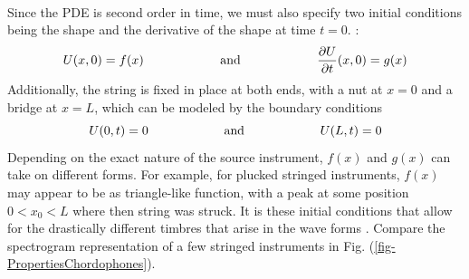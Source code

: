 \documentclass[12pt,letterpaper]{article}
\begin{document}
\paragraph*{}Since the PDE is second order in time, we must also specify two initial conditions being the shape and the derivative of the shape at time $t = 0$.  \cite{Olson,White,Haberman}:
\begin{equation}
U(x,0) = f(x) 
	\text{\hspace*{2cm} and \hspace*{2cm}}
\frac{\partial U}{\partial t}(x,0) = g(x)
\end{equation}
Additionally, the string is fixed in place at both ends, with a nut at $x = 0$ and a bridge at $x = L$, which can be modeled by the boundary conditions
\begin{equation}
U(0,t) = 0 
	\text{\hspace*{2cm} and \hspace*{2cm}}
U(L,t) = 0 
\end{equation}
Depending on the exact nature of the source instrument, $f(x)$ and $g(x)$ can take on different forms. For example, for plucked stringed instruments, $f(x)$ may appear to be as triangle-like function, with a peak at some position $0 < x_0 < L$ where then string was struck. It is these initial conditions that allow for the drastically different timbres that arise in the wave forms \cite{Hunter}. Compare the spectrogram representation of a few stringed instruments in Fig. (\ref{fig-PropertiesChordophones}).
\end{document}
